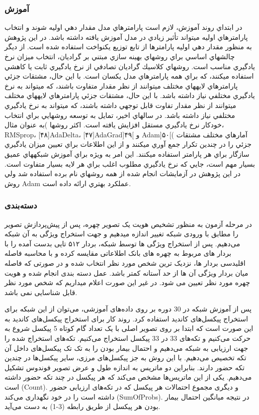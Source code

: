 \subsubsection{آموزش‌}
در ابتداي روند آموزش، لازم است پارامترهاي مدل مقدار دهي اوليه شوند و انتخاب پارامترهاي اوليه ميتواند تأثير زيادي در مدل آموزش يافته داشته باشد. در اين پژوهش به منظور مقدار دهي اوليه پارامترها از تابع توزيع يكنواخت استفاده شده است. از ديگر چالشهاي اساسي براي روشهاي بهينه سازي مبتني بر گراديان، انتخاب ميزان نرخ يادگيري مناسب است. روشهاي كلاسيك گراديان تصادفي از نرخ يادگيري ثابت يا كاهشي استفاده ميكنند، كه براي همه پارامترهاي مدل يكسان است. با اين حال، مشتقات جزئي پارامترهاي لايههاي مختلف ميتوانند از نظر مقدار متفاوت باشند، كه ميتواند به نرخ يادگيري مختلفي نياز داشته باشد. با اين حال، مشتقات جزئي پارامترهاي لايههاي مختلف ميتوانند از نظر مقدار تفاوت قابل توجهي داشته باشند، كه ميتواند به نرخ يادگيري مختلفي نياز داشته باشد. در سالهاي اخير، تمايل به توسعه روشهايي براي انتخاب خودكار نرخ يادگيري مستقل افزايش يافته است. اكثر روشها )به عنوان مثال، RMSprop، [۴۸]AdaDelta، [۴۷]AdaGrad]۴۹[ و Adam]۵۰[( آمارهاي مختلف مشتقات جزئي را در چندين تكرار جمع آوري ميكنند و از اين اطلاعات براي تعيين ميزان يادگيري سازگار براي هر پارامتر استفاده ميكنند. اين امر به ويژه براي آموزش شبكههاي عميق بسيار مهم است، جايي كه نرخ يادگيري مطلوب اغلب براي هر لايه بسيار متفاوت است. در اين پژوهش در آزمايشات انجام شده از همه روشهاي نام برده استفاده شد ولي روش Adam عملكرد بهتري ارائه داده است.

\subsubsection{دسته‌بندی}
در مرحله آزمون به منظور تشخیص هویت یک تصویر چهره، پس از پیش‌پردازش تصویر را مطابق با ورودی شبکه تغییر اندازه میدهیم و جهت استخراج ویژگی‌ به آن شبکه می‌دهیم. پس از استخراج ویژگی ها توسط شبکه، بردار ۵۱۲ تایی بدست آمده را با بردار های مربوط به چهره های بانک اطلاعاتی مقایسه کرده و با محاسبه فاصله اقلیدسی بردار ها، نزدیک ترین شخص مورد نظر انتخاب شده و در صورتی که فاصله میان بردار ویژگی آن ها از حد آستانه کمتر باشد. عمل دسته بندی انجام شده و هویت چهره مورد نظر تعیین می شود. در غیر این صورت اعلام میداریم که شخص مورد نظر قابل شناسایی نمی باشد.

پس از آموزش شبکه در 30 دوره بر روی داده‌های آموزشی، می‌توان از این شبکه برای استخراج پیکسل‌های کاندید استفاده کرد.
روند کار برای استخراج پیکسل‌های کاندید به این صورت است که ابتدا بر روی تصویر اصلی با یک تعداد گام کوتاه 5 پیکسل شروع به حرکت می‌کنیم و تکه‌های 33 در 33 پیکسل استخراج می‌کنیم. تکه‌های استخراج شده را جهت ارزیابی به شبکه می‌دهیم و احتمال بیمار بودن را به تک تک پیکسل‌های داخل آن تکه تخصیص می‌دهیم.
با این روش به جز پیکسل‌های مرزی، سایر پیکسل‌ها در چندین تکه حضور دارند. بنابراین دو ماتریس به اندازه طول و عرض تصویر فوندوس تشکیل می‌دهیم. یکی از این ماتریس‌ها مشخص می‌کند که هر پیکسل در چند تکه‌ حضور داشته است (Count). و دیگری مجموع احتمالات هر پیکسل که در تکه‌های ارزیابی حضور داشته است را در خود نگهداری می‌کند (SumOfProbs). در نتیجه میانگین احتمال بیمار بودن هر پیکسل از طریق رابطه (3-1) به دست می‌آید.

